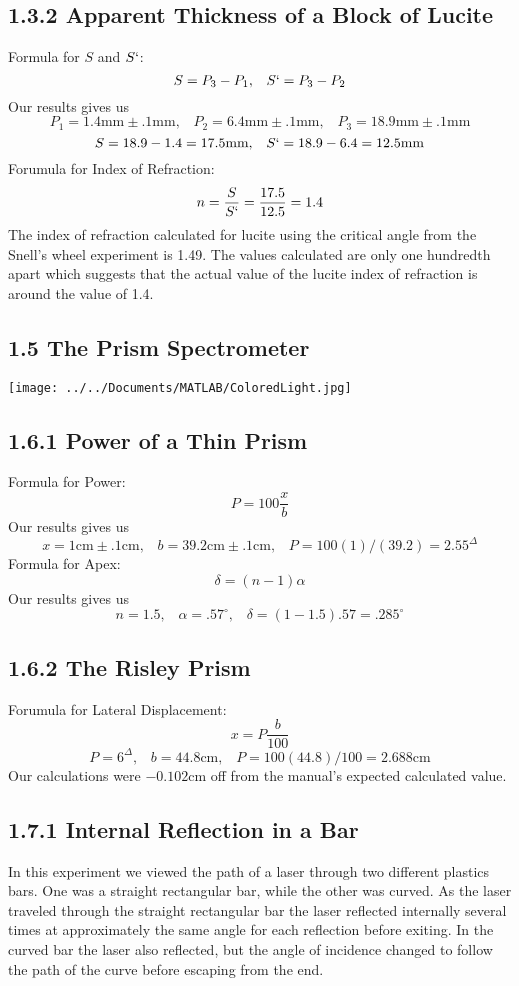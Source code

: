 \documentclass[12pt, oneside]{article}   	%
\begin{document}
\subsection*{1.3.2 Apparent Thickness of a Block of Lucite}
Formula for $S$ and $S`$:
$$ S = P_3 - P_1, \; \; \; S` = P_3 - P_2$$
Our results gives us
$$ P_1 = 1.4\text{mm}\pm.1\text{mm},\;\;\; P_2 = 6.4\text{mm}\pm.1\text{mm},\;\;\; P_3 = 18.9\text{mm}\pm.1\text{mm} $$
$$ S = 18.9 - 1.4 = 17.5\text{mm}, \; \; \; S` = 18.9 - 6.4 = 12.5\text{mm} $$  
Forumula for Index of Refraction:
$$ n = \frac{S}{S`} = \frac{17.5}{12.5} = 1.4 $$
The index of refraction calculated for lucite using the critical angle from the Snell's wheel experiment is 1.49.
The values calculated are only one hundredth apart which suggests that the actual value of the lucite index of refraction is around the value of 1.4.

\subsection*{1.5 The Prism Spectrometer}

\texttt{[image: ../../Documents/MATLAB/ColoredLight.jpg]} 



\subsection*{1.6.1 Power of a Thin Prism}
Formula for Power:
$$ P = 100\frac{x}{b} $$
Our results gives us
$$ x = 1\text{cm} \pm .1\text{cm}, \; \; \; b = 39.2\text{cm} \pm .1\text{cm}, \; \; \; P = 100(1)/(39.2) = 2.55^{\Delta}$$
Formula for Apex:
$$ \delta = (n-1)\alpha$$
Our results gives us
$$ n = 1.5, \; \; \; \alpha= .57^{\circ}, \; \; \; \delta = (1-1.5).57 = .285^{\circ} $$

\subsection*{1.6.2 The Risley Prism}
Forumula for Lateral Displacement:
$$ x = P\frac{b}{100} $$
$$ P = 6^{\Delta}, \; \; \; b = 44.8\text{cm}, \; \; \; P = 100(44.8)/100 = 2.688\text{cm}$$
Our calculations were $-0.102$cm off from the manual's expected calculated value. 
\subsection*{1.7.1 Internal Reflection in a Bar}
In this experiment we viewed the path of a laser through two different plastics bars.
One was a straight rectangular bar, while the other was curved. 
As the laser traveled through the straight rectangular bar the laser reflected internally several times at approximately the same angle for each reflection before exiting. 
In the curved bar the laser also reflected, but the angle of incidence changed to follow the path of the curve before escaping from the end.
\end{document}
